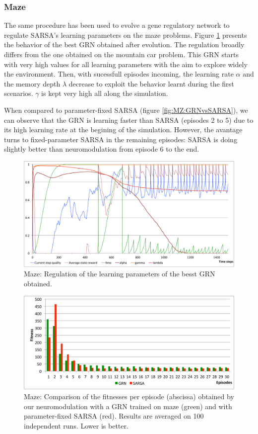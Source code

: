 \subsubsection{Maze}
The same procedure has been used to evolve a gene regulatory network to regulate SARSA's learning parameters on the maze problems. Figure \ref{fig:MZ:GRNBehavior} presents the behavior of the best GRN obtained after evolution. The regulation broadly differs from the one obtained on the mountain car problem. This GRN starts with very high values for all learning parameters with the aim to explore widely the environment. Then, with sucessfull episodes incoming, the learning rate $\alpha$ and the memory depth $\lambda$ decrease to exploit the behavior learnt during the first scenarios. $\gamma$ is kept very high all along the simulation.

When compared to parameter-fixed SARSA (figure \ref{fig:MZ:GRNvsSARSA}), we can observe that the GRN is learning faster than SARSA (episodes 2 to 5) due to its high learning rate at the begining of the simulation. However, the avantage turns to fixed-parameter SARSA in the remaining episodes: SARSA is doing slightly better than neuromodulation from episode 6 to the end.

\begin{figure}[h]
\center
\includegraphics[width=\linewidth]{MZ_GRNBehavior.pdf}
\caption{Maze: Regulation of the learning parameters of the besst GRN obtained.}\label{fig:MZ:GRNBehavior}
\end{figure}

\begin{figure}[h]
\center
\includegraphics[width=\linewidth]{MZ_GRNvsSARSA.pdf}
\caption{Maze: Comparison of the fitnesses per episode (abscissa) obtained by our neuromodulation with a GRN trained on maze (green) and with parameter-fixed SARSA (red). Results are averaged on 100 independent runs. Lower is better.}\label{fig:MC:GRNvsSARSA}
\end{figure}


